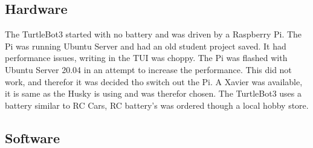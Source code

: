 \subsection{Hardware}
The TurtleBot3 started with no battery and was driven by a Raspberry Pi. The Pi was running Ubuntu Server and had an old student project saved. It had performance issues, writing in the TUI was choppy. The Pi was flashed with Ubuntu Server 20.04 in an attempt to increase the performance. This did not work, and therefor it was decided tho switch out the Pi. A Xavier was available, it is same as the Husky is using and was therefor chosen. The TurtleBot3 uses a battery similar to RC Cars, RC battery's was ordered though a local hobby store. 



\subsection{Software}
